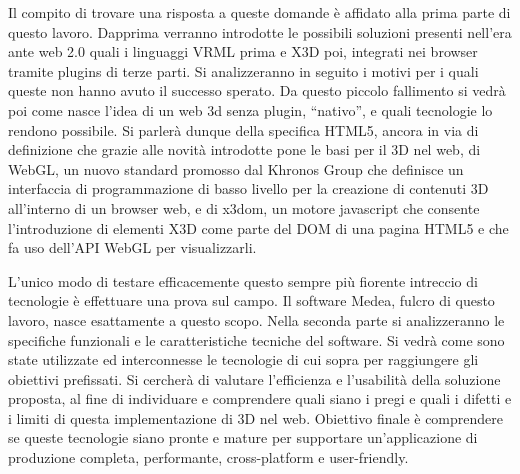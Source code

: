 Il compito di trovare una risposta a queste domande è affidato alla prima parte di questo lavoro. Dapprima verranno introdotte le possibili soluzioni presenti nell'era ante web 2.0 quali i linguaggi VRML prima e X3D poi, integrati nei browser tramite plugins di terze parti. Si analizzeranno in seguito i motivi per i quali queste non hanno avuto il successo sperato. Da questo piccolo fallimento si vedrà poi come nasce l'idea di un web 3d senza plugin, “nativo”, e quali tecnologie lo rendono possibile. Si parlerà dunque della specifica HTML5, ancora in via di definizione che grazie alle novità introdotte pone le basi per il 3D nel web, di WebGL, un nuovo standard promosso dal Khronos Group che definisce un interfaccia di programmazione di basso livello per la creazione di contenuti 3D all'interno di un browser web, e di x3dom, un motore javascript che consente l'introduzione di elementi X3D come parte del DOM di una pagina HTML5 e che fa uso dell'API WebGL per visualizzarli.

L'unico modo di testare efficacemente questo sempre più fiorente intreccio di tecnologie è effettuare una prova sul campo. Il software Medea, fulcro di questo lavoro, nasce esattamente a questo scopo. Nella seconda parte si analizzeranno le specifiche funzionali e le caratteristiche tecniche del software. Si vedrà come sono state utilizzate ed interconnesse le tecnologie di cui sopra per raggiungere gli obiettivi prefissati. Si cercherà di valutare l'efficienza e l'usabilità della soluzione proposta, al fine di individuare e comprendere quali siano i pregi e quali i difetti e i limiti di questa implementazione di 3D nel web. Obiettivo finale è comprendere se queste tecnologie siano pronte e mature per supportare un'applicazione di produzione completa, performante, cross-platform e user-friendly.

